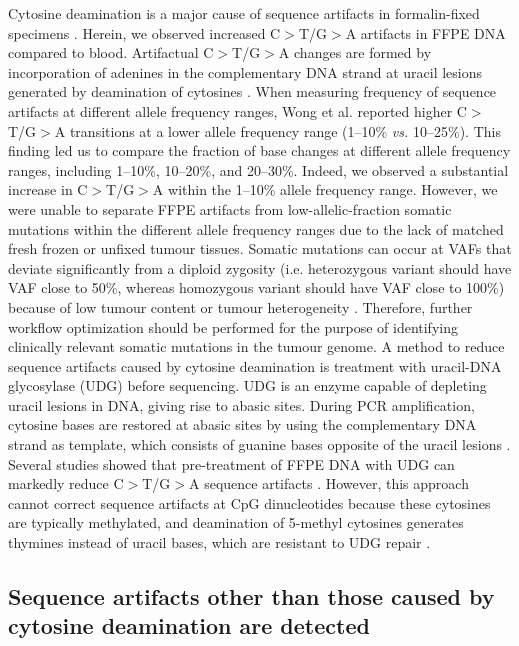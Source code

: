 Cytosine deamination is a major cause of sequence artifacts in formalin-fixed specimens \cite{Wong2014, Do2012, Oh2015, Spencer2013, Do2013, Kim2017, Chen2014}. Herein, we observed increased C$>$T/G$>$A artifacts in FFPE DNA compared to blood. Artifactual C$>$T/G$>$A changes are formed by incorporation of adenines in the complementary DNA strand at uracil lesions generated by deamination of cytosines \cite{Do2015a}. When measuring frequency of sequence artifacts at different allele frequency ranges, Wong et al. \cite{Wong2014} reported higher C$>$T/G$>$A transitions at a lower allele frequency range (1--10\% \textit{vs.} 10--25\%). This finding led us to compare the fraction of base changes at different allele frequency ranges, including 1--10\%, 10--20\%, and 20--30\%. Indeed, we observed a substantial increase in C$>$T/G$>$A within the 1--10\% allele frequency range. However, we were unable to separate FFPE artifacts from low-allelic-fraction somatic mutations within the different allele frequency ranges due to the lack of matched fresh frozen or unfixed tumour tissues. Somatic mutations can occur at VAFs that deviate significantly from a diploid zygosity (i.e. heterozygous variant should have VAF close to 50\%, whereas homozygous variant should have VAF close to 100\%) because of low tumour content or tumour heterogeneity \cite{Kim2017a, Xu2017, Carrot-Zhang2016, Tian2015, Cai2016}. Therefore, further workflow optimization should be performed for the purpose of identifying clinically relevant somatic mutations in the tumour genome. A method to reduce sequence artifacts caused by cytosine deamination is treatment with uracil-DNA glycosylase (UDG) before sequencing. UDG is an enzyme capable of depleting uracil lesions in DNA, giving rise to abasic sites. During PCR amplification, cytosine bases are restored at abasic sites by using the complementary DNA strand as template, which consists of guanine bases opposite of the uracil lesions \cite{Do2015a}. Several studies showed that pre-treatment of FFPE DNA with UDG can markedly reduce C$>$T/G$>$A sequence artifacts \cite{Do2013, Kim2017, Do2012}. However, this approach cannot correct sequence artifacts at CpG dinucleotides because these cytosines are typically methylated, and deamination of 5-methyl cytosines generates thymines instead of uracil bases, which are resistant to UDG repair \cite{Do2013}.

\subsection{Sequence artifacts other than those caused by cytosine deamination are detected}


